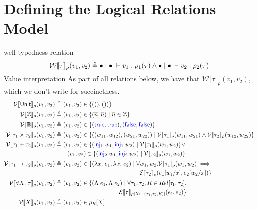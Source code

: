 \documentclass[twoside,11pt,openright]{report}
\theoremstyle{definition}
\newcommand{\Keyword}[1]{{\color{blue} \mathsf{#1}}}
\newcommand{\var}{x}
\newcommand{\expr}{e}
\newcommand{\val}{v}
\newcommand{\valB}{w}
\newcommand{\TT}{()}
\newcommand{\Num}[1]{\overline{#1}}
\newcommand{\True}{\Keyword{true}}
\newcommand{\False}{\Keyword{false}}
\newcommand{\Inj}[1]{\Keyword{inj}_{#1}\;}
\newcommand{\Tvar}{X}
\newcommand{\Tlam}{\Lambda\;}
\newcommand{\subst}[3]{#1{\left[#3 \middle/ #2 \right]}}
\newcommand{\Tunit}{\mathsf{Unit}}
\newcommand{\Tint}{\mathbb{Z}}
\newcommand{\Tbool}{\mathbb{B}}
\newcommand{\Tprod}[2]{#1 \times #2}
\newcommand{\Tsum}[2]{#1 + #2}
\newcommand{\Tfunc}[2]{#1 \rightarrow #2}
\newcommand{\Tall}[2]{\forall #1.\; #2}
\newcommand{\typ}{\tau}
\newcommand{\emptenv}{\bullet}
\newcommand{\empvenv}{\bullet}
\newcommand{\jdg}[4]{#1 \; | \; #2 \; \vdash #3 : #4}
\newcommand{\WtInp}[2]{\mathcal{W} \llbracket #1 \rrbracket_{#2}}
\newcommand{\WtInpGen}[2]{\WtInp{#1}{#2}(\val_1, \val_2)}
\newcommand{\ValInp}[2]{\mathcal{V} \llbracket #1 \rrbracket_{#2}}
\newcommand{\ValInpGen}[2]{\ValInp{#1}{#2}(\val_1, \val_2)}
\newcommand{\ExpInp}[2]{\mathcal{E} \llbracket #1 \rrbracket_{#2}}
\newcommand{\map}[2]{#1 \mapsto #2}
\begin{document}
\section{Defining the Logical Relations Model}
well-typedness relation
\begin{equation*}
  \WtInpGen{\typ}{\rho} \triangleq \jdg{\emptenv}{\empvenv}{\val_1}{\rho_1(\typ)} \land \jdg{\emptenv}{\empvenv}{\val_2}{\rho_2(\typ)}\\
\end{equation*}
Value interpretation
As part of all relations below, we have that $\WtInpGen{\typ}{\rho}$, which we don't write for succinctness.
\begin{align*}
  \ValInpGen{\Tunit}{\rho}  &\triangleq (\val_1, \val_2) \in \{(\TT, \TT)\}\\
  \ValInpGen{\Tint}{\rho}   &\triangleq (\val_1, \val_2) \in \{(\Num{n}, \Num{n}) \mid \Num{n} \in \Tint\}\\
  \ValInpGen{\Tbool}{\rho}  &\triangleq (\val_1, \val_2) \in \{(\True, \True), (\False, \False)\}\\
  \ValInpGen{\Tprod{\typ_1}{\typ_2}}{\rho}  &\triangleq (\val_1, \val_2) \in \{((\valB_{11}, \valB_{12}), (\valB_{21}, \valB_{22})) \mid \ValInp{\typ_1}{\rho}(\valB_{11}, \valB_{21}) \land \ValInp{\typ_2}{\rho}(\valB_{12}, \valB_{22})\}\\
  \ValInpGen{\Tsum{\typ_1}{\typ_2}}{\rho}   &\triangleq 
  \begin{aligned}[t]
    (\val_1, \val_2) \in \{(\Inj{1} \valB_1, \Inj{1} \valB_2) \mid \ValInp{\typ_1}{\rho}(\valB_1, \valB_2)\} \lor \\
    (\val_1, \val_2) \in \{(\Inj{2} \valB_1, \Inj{2} \valB_2) \mid \ValInp{\typ_2}{\rho}(\valB_1, \valB_2)\}
  \end{aligned}\\
  \ValInpGen{\Tfunc{\typ_1}{\typ_2}}{\rho}  &\triangleq 
  \begin{aligned}[t]
    (\val_1, \val_2) \in \{(\fun \var . \expr_1, \fun \var . \expr_2) \mid \forall \valB_1, \valB_2 . \ValInp{\typ_1}{\rho}(\valB_{1}, \valB_{2}) \implies\\
    \ExpInp{\typ_2}{\rho}(\subst{\expr_1}{\var}{\valB_1}, \subst{\expr_2}{\var}{\valB_2})\}
  \end{aligned}\\
  \ValInpGen{\Tall{\Tvar}{\typ}}{\rho}  &\triangleq 
  \begin{aligned}[t]
    (\val_1, \val_2) \in \{(\Tlam \expr_1, \Tlam \expr_2) \mid \forall \typ_1, \typ_2, R \in Rel[\typ_1, \typ_2] .\\
    \ExpInp{\typ}{\rho[\map{\Tvar}{(\typ_1, \typ_2, R)}]}(\expr_1, \expr_2)\}
  \end{aligned}\\
  \ValInpGen{\Tvar}{\rho} &\triangleq (\val_1, \val_2) \in \rho_R[\Tvar]\\
\end{align*}
\end{document}
